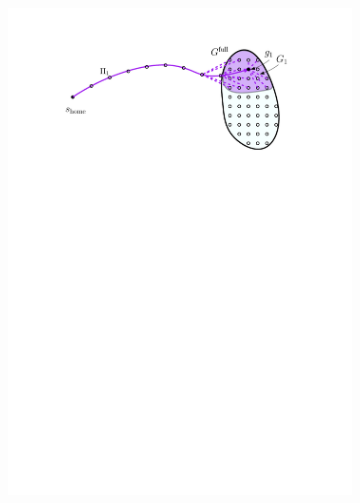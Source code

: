 \documentclass[conference]{IEEEtran}
\begin{document}
\begin{figure}[t]
\begin{subfigure}{0.3\textwidth}
        \includegraphics[width=\textwidth]{2_compute_root_paths_2}
        \caption{}
        \label{fig:crp2}
    \end{subfigure}
    \hspace{2mm}
    \begin{subfigure}{0.3\textwidth}

\end{subfigure}
\end{figure}
\end{document}
